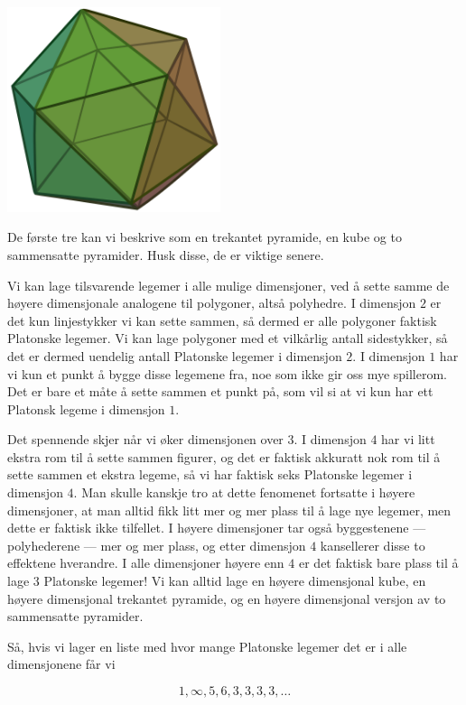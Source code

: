 \begin{center}
    \includegraphics[height = 6cm]{img/Icosahedron.png}
\end{center}

De første tre kan vi beskrive som en trekantet pyramide, en kube og to sammensatte pyramider. Husk disse, de er viktige senere. 

Vi kan lage tilsvarende legemer i alle mulige dimensjoner, ved å sette samme de høyere dimensjonale analogene til polygoner, altså polyhedre. I dimensjon $2$ er det kun linjestykker vi kan sette sammen, så dermed er alle polygoner faktisk Platonske legemer. Vi kan lage polygoner med et vilkårlig antall sidestykker, så det er dermed uendelig antall Platonske legemer i dimensjon $2$. I dimensjon $1$ har vi kun et punkt å bygge disse legemene fra, noe som ikke gir oss mye spillerom. Det er bare et måte å sette sammen et punkt på, som vil si at vi kun har ett Platonsk legeme i dimensjon $1$. 

Det spennende skjer når vi øker dimensjonen over $3$. I dimensjon $4$ har vi litt ekstra rom til å sette sammen figurer, og det er faktisk akkuratt nok rom til å sette sammen et ekstra legeme, så vi har faktisk seks Platonske legemer i dimensjon $4$. Man skulle kanskje tro at dette fenomenet fortsatte i høyere dimensjoner, at man alltid fikk litt mer og mer plass til å lage nye legemer, men dette er faktisk ikke tilfellet. I høyere dimensjoner tar også byggestenene — polyhederene — mer og mer plass, og etter dimensjon $4$ kansellerer disse to effektene hverandre. I alle dimensjoner høyere enn $4$ er det faktisk bare plass til å lage $3$ Platonske legemer! Vi kan alltid lage en høyere dimensjonal kube, en høyere dimensjonal trekantet pyramide, og en høyere dimensjonal versjon av to sammensatte pyramider. 

Så, hvis vi lager en liste med hvor mange Platonske legemer det er i alle dimensjonene får vi 

$$
1,\infty, 5, 6, 3, 3, 3, 3,\ldots
$$

